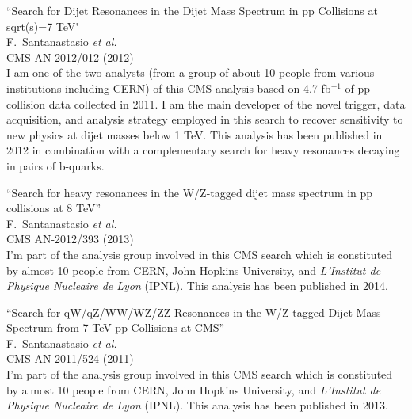 \documentclass[10pt, a4paper]{article}
\begin{document}
\begin{thebibliography}{599}
``Search for Dijet Resonances in the Dijet Mass Spectrum in pp Collisions at sqrt(s)=7 TeV"
  \\{}F.~Santanastasio {\it et al.}
  \\{}CMS AN-2012/012 (2012)
  \\ I am one of the two analysts (from a group of about 10 people from various 
  institutions including CERN) of this CMS analysis based on 4.7 fb$^{-1}$ of pp collision 
  data collected in 2011. I am the main developer of the novel trigger, data acquisition, and analysis strategy employed in this search to recover sensitivity to new physics at dijet masses below 1 TeV. This analysis has been published in 2012 in combination with a complementary search for heavy resonances decaying in pairs of b-quarks.

``Search for heavy resonances in the W/Z-tagged dijet mass spectrum in pp collisions at 8 TeV''
  \\{}F.~Santanastasio {\it et al.}
  \\{}CMS AN-2012/393 (2013)
  \\ I'm part of the analysis group involved in this CMS search which is constituted by almost 10 people from CERN, John Hopkins University, and \textit{L'Institut de Physique Nucleaire de Lyon} (IPNL). This analysis has been published in 2014.

``Search for qW/qZ/WW/WZ/ZZ Resonances in the W/Z-tagged Dijet Mass Spectrum from 7 TeV pp Collisions at CMS''
  \\{}F.~Santanastasio {\it et al.}
  \\{}CMS AN-2011/524 (2011)
  \\ I'm part of the analysis group involved in this CMS search which is constituted by almost 10 people from CERN, John Hopkins University, and \textit{L'Institut de Physique Nucleaire de Lyon} (IPNL). This analysis has been published in 2013.



\end{thebibliography}
\end{document}
